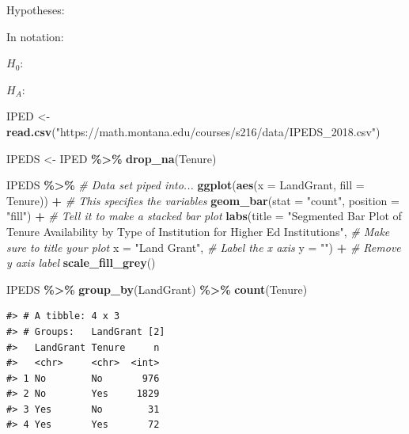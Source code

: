 \documentclass[
]{report}
\newenvironment{Shaded}{\begin{snugshade}}{\end{snugshade}}
\newcommand{\AttributeTok}[1]{\textcolor[rgb]{0.13,0.29,0.53}{#1}}
\newcommand{\CommentTok}[1]{\textcolor[rgb]{0.56,0.35,0.01}{\textit{#1}}}
\newcommand{\FunctionTok}[1]{\textcolor[rgb]{0.13,0.29,0.53}{\textbf{#1}}}
\newcommand{\NormalTok}[1]{#1}
\newcommand{\OtherTok}[1]{\textcolor[rgb]{0.56,0.35,0.01}{#1}}
\newcommand{\SpecialCharTok}[1]{\textcolor[rgb]{0.81,0.36,0.00}{\textbf{#1}}}
\newcommand{\StringTok}[1]{\textcolor[rgb]{0.31,0.60,0.02}{#1}}
\begin{document}
\vspace{0.8in}

Hypotheses:

In notation:

\(H_0:\)

\vspace{0.2in}

\(H_A:\)

\vspace{0.2in}

\begin{Shaded}
\begin{Highlighting}[]
\NormalTok{IPED }\OtherTok{\textless{}{-}}\FunctionTok{read.csv}\NormalTok{(}\StringTok{"https://math.montana.edu/courses/s216/data/IPEDS\_2018.csv"}\NormalTok{)}

\NormalTok{IPEDS }\OtherTok{\textless{}{-}}\NormalTok{ IPED }\SpecialCharTok{\%\textgreater{}\%}
    \FunctionTok{drop\_na}\NormalTok{(Tenure)}

\NormalTok{IPEDS }\SpecialCharTok{\%\textgreater{}\%} \CommentTok{\# Data set piped into...}
    \FunctionTok{ggplot}\NormalTok{(}\FunctionTok{aes}\NormalTok{(}\AttributeTok{x =}\NormalTok{ LandGrant, }\AttributeTok{fill =}\NormalTok{ Tenure)) }\SpecialCharTok{+}   \CommentTok{\# This specifies the variables}
  \FunctionTok{geom\_bar}\NormalTok{(}\AttributeTok{stat =} \StringTok{"count"}\NormalTok{, }\AttributeTok{position =} \StringTok{"fill"}\NormalTok{) }\SpecialCharTok{+}  \CommentTok{\# Tell it to make a stacked bar plot}
  \FunctionTok{labs}\NormalTok{(}\AttributeTok{title =} \StringTok{"Segmented Bar Plot of Tenure Availability }
\StringTok{       by Type of Institution for Higher Ed Institutions"}\NormalTok{,  }
       \CommentTok{\# Make sure to title your plot }
       \AttributeTok{x =} \StringTok{"Land Grant"}\NormalTok{,   }\CommentTok{\# Label the x axis}
       \AttributeTok{y =} \StringTok{""}\NormalTok{) }\SpecialCharTok{+} \CommentTok{\# Remove y axis label }
    \FunctionTok{scale\_fill\_grey}\NormalTok{()}

\NormalTok{IPEDS }\SpecialCharTok{\%\textgreater{}\%} \FunctionTok{group\_by}\NormalTok{(LandGrant) }\SpecialCharTok{\%\textgreater{}\%} \FunctionTok{count}\NormalTok{(Tenure)}
\end{Highlighting}
\end{Shaded}

\begin{verbatim}
#> # A tibble: 4 x 3
#> # Groups:   LandGrant [2]
#>   LandGrant Tenure     n
#>   <chr>     <chr>  <int>
#> 1 No        No       976
#> 2 No        Yes     1829
#> 3 Yes       No        31
#> 4 Yes       Yes       72
\end{verbatim}
\end{document}
